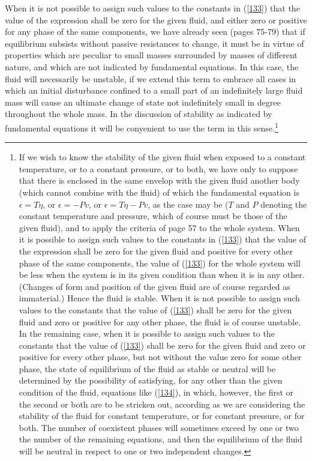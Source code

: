 \documentclass[12pt]{article}
\begin{document}
When it is not possible to assign such values to the constants in (\ref{133}) that the value of the expression shall be zero for the given fluid, and either zero or positive for any phase of the same components, we have already seen (pages 75-79) that if equilibrium subsists without passive resistances to change, it must be in virtue of properties which are peculiar to small masses surrounded by masses of different nature, and which are not indicated by fundamental equations. In this case, the fluid will necessarily be unstable, if we extend this term to embrace all cases in which an initial disturbance confined to a small part of an indefinitely large fluid mass will cause an ultimate change of state not indefinitely small in degree throughout the whole mass. In the discussion of stability as indicated by fundamental equations it will be conyenient to use the term in this sense.\footnote{If we wish to know the stability of the given fluid when exposed to a constant temperature, or to a constant pressure, or to both, we have only to suppose that there is enclosed in the same envelop with the given fluid another body (which cannot combine with the fluid) of which the fundamental equation is $\epsilon= T\eta$, or $\epsilon= - Pv$, or $\epsilon= T\eta - Pv$, as the case may be ($T$ and $P$ denoting the constant temperature and pressure, which of course must be those of the given fluid), and to apply the criteria of page 57 to the whole system.  When it is possible to assign such values to the constants in (\ref{133}) that the value of the expression shall be zero for the given fluid and positive for every other phase of the same components, the value of (\ref{133}) for the whole system will be less when the system is in its given condition than when it is in any other. (Changes of form and position of the given fluid are of course regarded as immaterial.) Hence the fluid is stable. When it is not possible to assign such values to the constants that the value of (\ref{133}) shall be zero for the given fluid and zero or positive for any other phase, the fluid is of course unstable. In the remaining case, when it is possible to assign such values to the constants that the value of (\ref{133}) shall be zero for the given fluid and zero or positive for every other phase, but not without the value zero for some other phase, the state of equilibrium of the fluid as stable or neutral will be determined by the possibility of satisfying, for any other than the given condition of the fluid, equations like (\ref{134}), in which, however, the first or the second or both are to be stricken out, according as we are considering the stability of the fluid for constant temperature, or for constant pressure, or for both.  The number of coexistent phases will sometimes exceed by one or two the number of the remaining equations, and then the equilibrium of the fluid will be neutral in respect to one or two independent changes.}
\end{document}
